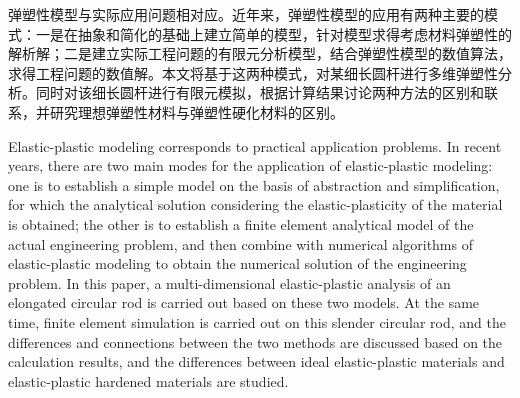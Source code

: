 \begin{cabstract}  
弹塑性模型与实际应用问题相对应。近年来，弹塑性模型的应用有两种主要的模式：一是在抽象和简化的基础上建立简单的模型，针对模型求得考虑材料弹塑性的解析解；二是建立实际工程问题的有限元分析模型，结合弹塑性模型的数值算法，求得工程问题的数值解。本文将基于这两种模式，对某细长圆杆进行多维弹塑性分析。同时对该细长圆杆进行有限元模拟，根据计算结果讨论两种方法的区别和联系，并研究理想弹塑性材料与弹塑性硬化材料的区别。
\end{cabstract}


\begin{eabstract}
Elastic-plastic modeling corresponds to practical application problems. In recent years, there are two main modes for the application of elastic-plastic modeling: one is to establish a simple model on the basis of abstraction and simplification, for which the analytical solution considering the elastic-plasticity of the material is obtained; the other is to establish a finite element analytical model of the actual engineering problem, and then combine with numerical algorithms of elastic-plastic modeling to obtain the numerical solution of the engineering problem. In this paper, a multi-dimensional elastic-plastic analysis of an elongated circular rod is carried out based on these two models. At the same time, finite element simulation is carried out on this slender circular rod, and the differences and connections between the two methods are discussed based on the calculation results, and the differences between ideal elastic-plastic materials and elastic-plastic hardened materials are studied.
\end{eabstract}

